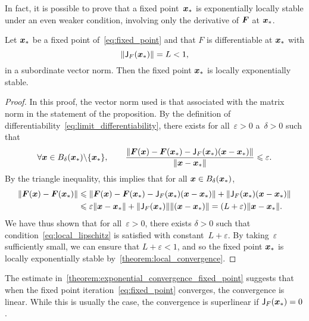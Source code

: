 In fact, it is possible to prove that a fixed point~$\mathbf{\boldsymbol{x}}_*$ is exponentially locally stable under an even weaker condition,
involving only the derivative of $\mathbf{\boldsymbol{F}}$ at $\mathbf{\boldsymbol{x}}_*$.
\begin{proposition}
    \label{proposition:local_convergence}
    Let $\mathbf{\boldsymbol{x}}_*$ be a fixed point of~\eqref{eq:fixed_point} and that $F$ is differentiable at $\mathbf{\boldsymbol{x}}_*$ with
    \[
        \lVert\mathsf J_F(\mathbf{\boldsymbol{x}}_*)\rVert = L < 1,
    \]
    in a subordinate vector norm.
    Then  the fixed point $\mathbf{\boldsymbol{x}}_*$ is locally exponentially stable.
\end{proposition}
\begin{proof}
    In this proof, the vector norm used is that associated with the matrix norm in the statement of the proposition.
    By the definition of differentiability~\eqref{eq:limit_differentiability},
    there exists for all~$\varepsilon > 0$ a~$\delta > 0$ such that
    \[
        \forall \mathbf{\boldsymbol{x}} \in B_{\delta} (\mathbf{\boldsymbol{x}}_*) \backslash \{ \mathbf{\boldsymbol{x}}_* \}, \qquad
        \frac{\lVert\mathbf{\boldsymbol{F}}(\mathbf{\boldsymbol{x}}) - \mathbf{\boldsymbol{F}}(\mathbf{\boldsymbol{x}}_*) - \mathsf J_F(\mathbf{\boldsymbol{x}}_*)(\mathbf{\boldsymbol{x}} - \mathbf{\boldsymbol{x}}_*)\rVert}{\lVert\mathbf{\boldsymbol{x}} - \mathbf{\boldsymbol{x}}_*\rVert} \leqslant \varepsilon.
    \]
    By the triangle inequality,
    this implies that for all $\mathbf{\boldsymbol{x}} \in B_{\delta} (\mathbf{\boldsymbol{x}}_*)$,
    \begin{align*}
        \lVert\mathbf{\boldsymbol{F}}(\mathbf{\boldsymbol{x}}) - \mathbf{\boldsymbol{F}}(\mathbf{\boldsymbol{x}}_*)\rVert
        &\leqslant
        \lVert\mathbf{\boldsymbol{F}}(\mathbf{\boldsymbol{x}}) - \mathbf{\boldsymbol{F}}(\mathbf{\boldsymbol{x}}_*) - \mathsf J_F(\mathbf{\boldsymbol{x}}_*)(\mathbf{\boldsymbol{x}} - \mathbf{\boldsymbol{x}}_*)\rVert + \lVert\mathsf J_F(\mathbf{\boldsymbol{x}}_*)(\mathbf{\boldsymbol{x}} - \mathbf{\boldsymbol{x}}_*)\rVert \\
        &\leqslant
        \varepsilon \lVert\mathbf{\boldsymbol{x}} - \mathbf{\boldsymbol{x}}_*\rVert + \lVert\mathsf J_F(\mathbf{\boldsymbol{x}}_*)\rVert \lVert(\mathbf{\boldsymbol{x}} - \mathbf{\boldsymbol{x}}_*)\rVert
        = (L + \varepsilon) \lVert\mathbf{\boldsymbol{x}} - \mathbf{\boldsymbol{x}}_*\rVert.
    \end{align*}
    We have thus shown that for all~$\varepsilon > 0$,
    there exists $\delta > 0$ such that condition~\eqref{eq:local_lipschitz} is satisfied with constant~$L+\varepsilon$.
    By taking~$\varepsilon$ sufficiently small,
    we can ensure that $L + \varepsilon < 1$,
    and so the fixed point $\mathbf{\boldsymbol{x}}_*$ is locally exponentially stable by~\cref{theorem:local_convergence}.
\end{proof}

The estimate in~\cref{theorem:exponential_convergence_fixed_point} suggests that
when the fixed point iteration~\eqref{eq:fixed_point} converges,
the convergence is linear.
While this is usually the case,
the convergence is superlinear if $\mathsf J_F(\mathbf{\boldsymbol{x}}_*) = 0$.

